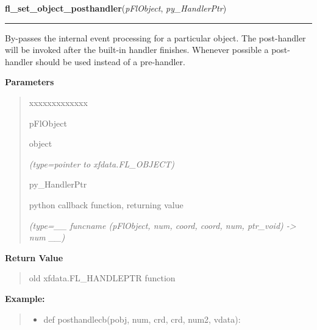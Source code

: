 \hspace{.8\funcindent}\begin{boxedminipage}{\funcwidth}

    \raggedright \textbf{fl\_set\_object\_posthandler}(\textit{pFlObject}, \textit{py\_HandlerPtr})

    \vspace{-1.5ex}

    \rule{\textwidth}{0.5\fboxrule}
\setlength{\parskip}{2ex}
    By-passes the internal event processing for a particular object. The 
    post-handler will be invoked after the built-in handler finishes. 
    Whenever possible a post-handler should be used instead of a 
    pre-handler.

\setlength{\parskip}{1ex}
      \textbf{Parameters}
      \vspace{-1ex}

      \begin{quote}
        \begin{Ventry}{xxxxxxxxxxxxx}

          \item[pFlObject]

          object

            {\it (type=pointer to xfdata.FL\_OBJECT)}

          \item[py\_HandlerPtr]

          python callback function, returning value

            {\it (type=\_\_ funcname (pFlObject, num, coord, coord, num, ptr\_void) 
-{\textgreater} num \_\_)}

        \end{Ventry}

      \end{quote}

      \textbf{Return Value}
    \vspace{-1ex}

      \begin{quote}
      old xfdata.FL\_HANDLEPTR function

      \end{quote}

\textbf{Example:}
\begin{quote}
  \begin{itemize}

  \item
    \setlength{\parskip}{0.6ex}
def posthandlecb(pobj, num, crd, crd, num2, vdata):




\end{itemize}
\end{quote}
\end{boxedminipage}
